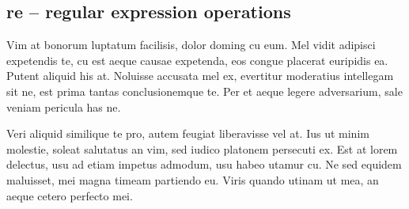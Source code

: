 \subsection{re -- regular expression operations}
Vim at bonorum luptatum facilisis, dolor doming cu eum. Mel vidit adipisci expetendis te, cu est aeque causae expetenda, eos congue placerat euripidis ea. Putent aliquid his at. Noluisse accusata mel ex, evertitur moderatius intellegam sit ne, est prima tantas conclusionemque te. Per et aeque legere adversarium, sale veniam pericula has ne.

Veri aliquid similique te pro, autem feugiat liberavisse vel at. Ius ut minim molestie, soleat salutatus an vim, sed iudico platonem persecuti ex. Est at lorem delectus, usu ad etiam impetus admodum, usu habeo utamur cu. Ne sed equidem maluisset, mei magna timeam partiendo eu. Viris quando utinam ut mea, an aeque cetero perfecto mei.

